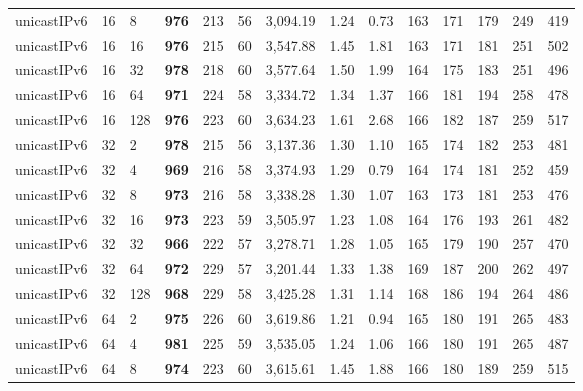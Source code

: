 \begin{table}[!htb]
\begin{tabular}{@{}llllllllllllll@{}}
		unicastIPv6 & 16           & 8     & \textbf{976}  & 213  & 56  & 3,094.19 & 1.24     & 0.73     & 163 & 171 & 179 & 249 & 419  \\
		unicastIPv6 & 16           & 16    & \textbf{976}  & 215  & 60  & 3,547.88 & 1.45     & 1.81     & 163 & 171 & 181 & 251 & 502  \\
		unicastIPv6 & 16           & 32    & \textbf{978}  & 218  & 60  & 3,577.64 & 1.50     & 1.99     & 164 & 175 & 183 & 251 & 496  \\
		unicastIPv6 & 16           & 64    & \textbf{971}  & 224  & 58  & 3,334.72 & 1.34     & 1.37     & 166 & 181 & 194 & 258 & 478  \\
		unicastIPv6 & 16           & 128   & \textbf{976}  & 223  & 60  & 3,634.23 & 1.61     & 2.68     & 166 & 182 & 187 & 259 & 517  \\ \hline
		unicastIPv6 & 32           & 2     & \textbf{978}  & 215  & 56  & 3,137.36 & 1.30     & 1.10     & 165 & 174 & 182 & 253 & 481  \\
		unicastIPv6 & 32           & 4     & \textbf{969}  & 216  & 58  & 3,374.93 & 1.29     & 0.79     & 164 & 174 & 181 & 252 & 459  \\
		unicastIPv6 & 32           & 8     & \textbf{973}  & 216  & 58  & 3,338.28 & 1.30     & 1.07     & 163 & 173 & 181 & 253 & 476  \\
		unicastIPv6 & 32           & 16    & \textbf{973}  & 223  & 59  & 3,505.97 & 1.23     & 1.08     & 164 & 176 & 193 & 261 & 482  \\
		unicastIPv6 & 32           & 32    & \textbf{966}  & 222  & 57  & 3,278.71 & 1.28     & 1.05     & 165 & 179 & 190 & 257 & 470  \\
		unicastIPv6 & 32           & 64    & \textbf{972}  & 229  & 57  & 3,201.44 & 1.33     & 1.38     & 169 & 187 & 200 & 262 & 497  \\
		unicastIPv6 & 32           & 128   & \textbf{968}  & 229  & 58  & 3,425.28 & 1.31     & 1.14     & 168 & 186 & 194 & 264 & 486  \\ \hline
		unicastIPv6 & 64           & 2     & \textbf{975}  & 226  & 60  & 3,619.86 & 1.21     & 0.94     & 165 & 180 & 191 & 265 & 483  \\
		unicastIPv6 & 64           & 4     & \textbf{981}  & 225  & 59  & 3,535.05 & 1.24     & 1.06     & 166 & 180 & 191 & 265 & 487  \\
		unicastIPv6 & 64           & 8     & \textbf{974}  & 223  & 60  & 3,615.61 & 1.45     & 1.88     & 166 & 180 & 189 & 259 & 515  \\

\end{tabular}
\end{table}
